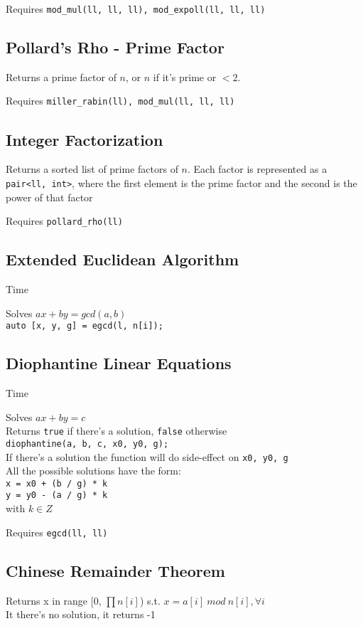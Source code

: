 Requires \verb|mod_mul(ll, ll, ll), mod_expoll(ll, ll, ll)|


\subsection{Pollard's Rho - Prime Factor}
Returns a prime factor of $n$, or $n$ if it's prime or $< 2$.

Requires \verb|miller_rabin(ll), mod_mul(ll, ll, ll)|


\subsection{Integer Factorization}
Returns a sorted list of prime factors of $n$.
Each factor is represented as a \verb|pair<ll, int>|,
where the first element is the prime factor and the second is the power of that factor

Requires \verb|pollard_rho(ll)|


\subsection{Extended Euclidean Algorithm}
 Time

Solves $ax + by = gcd(a, b)$ \\
\verb|auto [x, y, g] = egcd(l, n[i]);|


\subsection{Diophantine Linear Equations}
 Time

Solves $ax + by = c$ \\
Returns \verb|true| if there's a solution, \verb|false| otherwise \\
\verb|diophantine(a, b, c, x0, y0, g);| \\
If there's a solution the function will do side-effect on \verb|x0, y0, g|\\
All the possible solutions have the form: \\
\verb|x = x0 + (b / g) * k| \\
\verb|y = y0 - (a / g) * k| \\
with $k \in Z$

Requires \verb|egcd(ll, ll)|


\subsection{Chinese Remainder Theorem}
Returns x in range [0, $\prod{n[i]}$) s.t.
$x = a[i] \: mod \: n[i], \forall i$ \\
It there's no solution, it returns -1

